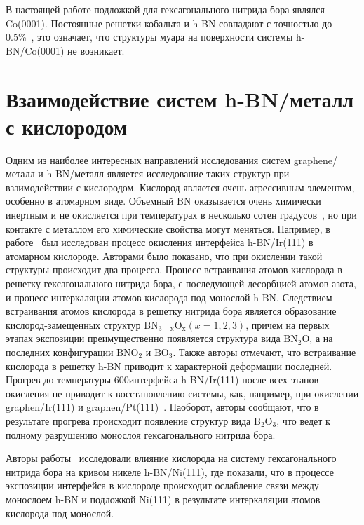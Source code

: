 В настоящей работе подложкой для гексагонального нитрида бора являлся Co(0001). Постоянные решетки кобальта и h-BN совпадают с точностью до 0.5\%~\cite{Usachov2018_h-BN/_PED_STM}, это означает, что структуры муара на 
поверхности системы h-BN/Co(0001) не возникает.

\section{Взаимодействие систем h-BN/металл с кислородом}





Одним из наиболее интересных направлений исследования систем graphene/металл и
h-BN/металл является исследование таких структур при взаимодействии с 
кислородом. Кислород является очень агрессивным элементом, особенно в атомарном
виде. Объемный BN оказывается очень химически инертным и не окисляется 
при температурах в несколько сотен градусов~\cite{Li2014}, но при контакте
с металлом его химические свойства могут меняться.
Например, в работе~\cite{Simonov2012_h-BN/Ir_Oxydation} был исследован
процесс окисления интерфейса h-BN/Ir(111) в атомарном кислороде. Авторами
было показано, что при окислении такой структуры происходит два процесса.
Процесс встраивания атомов кислорода в решетку гексагонального нитрида бора,
с последующей десорбцией атомов азота,
и процесс интеркаляции атомов кислорода под монослой h-BN.  
Следствием встраивания атомов кислорода в решетку нитрида бора является 
образование кислород-замещенных структур $\mathrm{BN_{3-x}O_x}(x=1,2,3)$,
причем на первых этапах экспозиции преимущественно появляется структура вида $\mathrm{BN_2O}$, а на последних конфигурации $\mathrm{BNO_2}$ и $\mathrm{BO_3}$.
Также авторы отмечают, что встраивание кислорода в решетку h-BN приводит
к характерной деформации последней. Прогрев до температуры 600  интерфейса h-BN/Ir(111) после всех этапов
окисления не приводит к восстановлению системы,
как, например, при окислении graphen/Ir(111) и graphen/Pt(111)~\cite{Vinogradov2011}.
Наоборот, авторы сообщают, что в результате прогрева происходит появление
структур вида $\mathrm{B_2O_3}$, что ведет к полному разрушению монослоя 
гексагонального нитрида бора.


Авторы работы~\cite{Makarova2019_h-BN/Ni_Oxydation} исследовали влияние 
кислорода на систему гексагонального нитрида бора на кривом никеле
h-BN/Ni(111), где показали, что в процессе экспозиции интерфейса в кислороде
происходит ослабление связи между монослоем h-BN и подложкой Ni(111) 
в результате интеркаляции атомов кислорода под монослой. 


